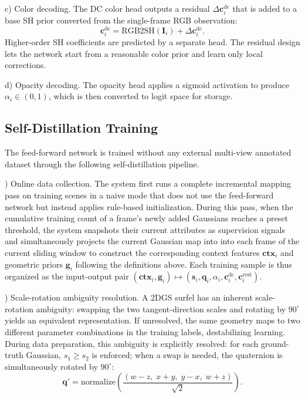 \documentclass[letterpaper, 10pt, conference]{ieeeconf}
\begin{document}
\vspace{0.25em}
\noindent c) Color decoding. The DC color head outputs a residual $\Delta \mathbf{c}_i^{\text{dc}}$ that is added to a base SH prior converted from the single-frame RGB observation:
%
\begin{equation}
\mathbf{c}_i^{\text{dc}} = \text{RGB2SH}(\mathbf{I}_i) + \Delta \mathbf{c}_i^{\text{dc}}.
\end{equation}
%
Higher-order SH coefficients are predicted by a separate head. The residual design lets the network start from a reasonable color prior and learn only local corrections.

\vspace{0.25em}
\noindent d) Opacity decoding. The opacity head applies a sigmoid activation to produce $\alpha_i \in (0,1)$, which is then converted to logit space for storage.

\subsection{Self-Distillation Training}

The feed-forward network is trained without any external multi-view annotated dataset through the following self-distillation pipeline.

\vspace{0.35em}
) Online data collection. The system first runs a complete incremental mapping pass on training scenes in a naive mode that does not use the feed-forward network but instead applies rule-based initialization. During this pass, when the cumulative training count of a frame's newly added Gaussians reaches a preset threshold, the system snapshots their current attributes as supervision signals and simultaneously projects the current Gaussian map into into each frame of the current sliding window to construct the corresponding context features $\mathbf{ctx}_i$ and geometric priors $\mathbf{g}_i$ following the definitions above. Each training sample is thus organized as the input-output pair $(\mathbf{ctx}_i, \mathbf{g}_i) \mapsto (\mathbf{s}_i, \mathbf{q}_i, \alpha_i, \mathbf{c}_i^{\mathrm{dc}}, \mathbf{c}_i^{\mathrm{rest}})$.

\vspace{0.35em}
) Scale-rotation ambiguity resolution. A 2DGS surfel has an inherent scale-rotation ambiguity: swapping the two tangent-direction scales and rotating by $90^\circ$ yields an equivalent representation. If unresolved, the same geometry maps to two different parameter combinations in the training labels, destabilizing learning. During data preparation, this ambiguity is explicitly resolved: for each ground-truth Gaussian, $s_1 \geq s_2$ is enforced; when a swap is needed, the quaternion is simultaneously rotated by $90^\circ$:
%
\begin{equation}
\mathbf{q}' = \text{normalize}\left(\frac{(w{-}z,\; x{+}y,\; y{-}x,\; w{+}z)}{\sqrt{2}}\right).
\end{equation}
\end{document}
